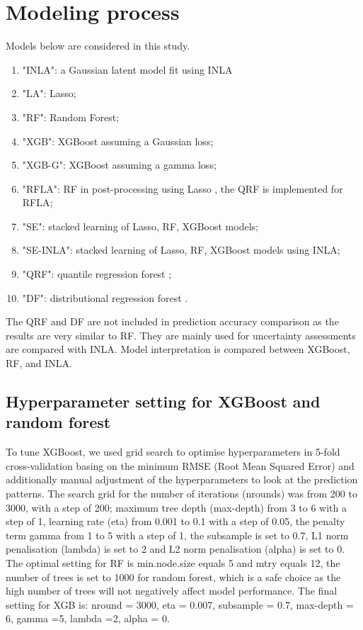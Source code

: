 \documentclass{article}
\begin{document}
 

\section{Modeling process}
 
Models below are considered in this study. 
\begin{enumerate}
    
\item "INLA": a Gaussian latent model fit using INLA %
\item "LA": Lasso; 
\item "RF": Random Forest; 
\item "XGB": XGBoost assuming a Gaussian loss; 
\item "XGB-G": XGBoost assuming a gamma loss; 
\item "RFLA": RF in post-processing using Lasso \citep{hastie2009elements}, the QRF is implemented for RFLA; 
\item "SE": stacked learning of Lasso, RF, XGBoost models; 
\item "SE-INLA": stacked learning of Lasso, RF, XGBoost models using INLA;
\item "QRF": quantile regression forest \citep{meinshausen2006quantile};
\item "DF": distributional regression forest \citep{schlosser2019distributional}.
\end{enumerate}

The QRF and DF are not included in prediction accuracy comparison as the results are very similar to RF. They are mainly used for uncertainty assessments are compared with INLA. Model interpretation is compared between XGBoost, RF, and INLA. 

\subsection{Hyperparameter setting for XGBoost and random forest}
\label{sec:hp}

To tune XGBoost, we used grid search to optimise hyperparameters in 5-fold cross-validation basing on the minimum RMSE (Root Mean Squared Error) and additionally manual adjustment of the hyperparameters to look at the prediction patterns. The search grid for the number of iterations (nrounds) was from 200 to 3000, with a step of 200; maximum tree depth (max-depth) from 3 to 6 with a step of 1, learning rate (eta) from 0.001 to 0.1 with a step of 0.05, the penalty term gamma \citep{xgboost}  from 1 to 5 with a step of 1, the subsample is set to 0.7, L1 norm penalisation (lambda) is set to 2 and L2 norm penalisation (alpha) is set to 0.  The optimal setting for RF is min.node.size equals 5 and mtry equals 12, the number of trees is set to 1000 for random forest, which is a safe choice as the high number of trees will not negatively affect model performance. The final setting for XGB is: nround = 3000, eta = 0.007, subsample = 0.7, max-depth = 6, gamma =5, lambda =2, alpha = 0. 
\end{document}
